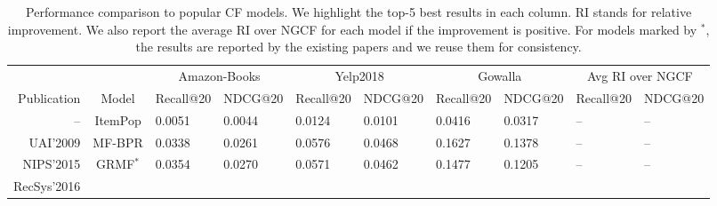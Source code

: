 \documentclass[sigconf,authorversion]{acmart}
\begin{document}
\begin{table*}[!t]
\renewcommand\arraystretch{1.01}
\centering
\caption{Performance comparison to popular CF models. We highlight the top-5 best results in each column. RI stands for relative improvement. We also report the average RI over NGCF for each model if the improvement is positive. For models marked by $^\ast$, the results are reported by the existing papers and we reuse them for consistency.}
\begin{tabular}{rcllllllll}
\hline
\multicolumn{1}{r|}{} &
  \multicolumn{1}{c|}{} &
  \multicolumn{2}{c|}{Amazon-Books} &
  \multicolumn{2}{c|}{Yelp2018} &
  \multicolumn{2}{c|}{Gowalla} &
  \multicolumn{2}{c}{Avg RI over NGCF} \\ \cline{3-10} 
\multicolumn{1}{r|}{\multirow{-2}{*}{Publication}} &
  \multicolumn{1}{c|}{\multirow{-2}{*}{Model}} &
  \hspace{-0.5ex}Recall@20 &
  \multicolumn{1}{l|}{\hspace{-0.5ex}NDCG@20} &
  \hspace{-0.5ex}Recall@20 &
  \multicolumn{1}{l|}{\hspace{-0.5ex}NDCG@20} &
  \hspace{-0.5ex}Recall@20 &
  \multicolumn{1}{l|}{\hspace{-0.5ex}NDCG@20} &
  \hspace{-0.5ex}Recall@20 &
  \hspace{-0.5ex}NDCG@20 \\ \hline
\multicolumn{1}{r|}{--} &
  \multicolumn{1}{c|}{ItemPop} &
  0.0051 &
  \multicolumn{1}{l|}{0.0044} &
  0.0124 &
  \multicolumn{1}{l|}{0.0101} &
  0.0416 &
  \multicolumn{1}{l|}{0.0317} &
  -- &
  -- \\
  \multicolumn{1}{r|}{UAI'2009} &
  \multicolumn{1}{c|}{MF-BPR} &
  0.0338 &
  \multicolumn{1}{l|}{0.0261} &
  0.0576 &
  \multicolumn{1}{l|}{0.0468} &
  0.1627 &
  \multicolumn{1}{l|}{0.1378} &
  -- &
  -- \\
\multicolumn{1}{r|}{NIPS'2015} &
  \multicolumn{1}{c|}{GRMF$^\ast$} &
  0.0354 &
  \multicolumn{1}{l|}{0.0270} &
  0.0571 &
  \multicolumn{1}{l|}{0.0462} &
  0.1477 &
  \multicolumn{1}{l|}{0.1205} &
  -- &
  -- \\
\multicolumn{1}{r|}{RecSys'2016} & 


\end{tabular}
\end{table*}
\end{document}
